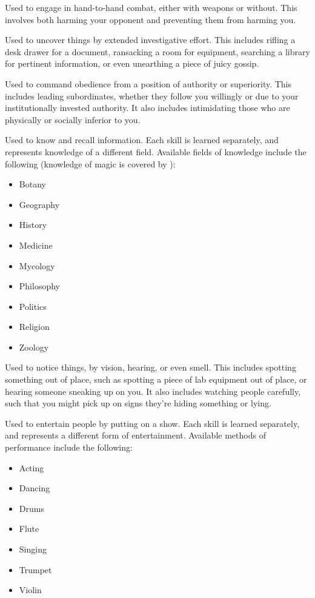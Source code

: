 
Used to engage in hand-to-hand combat, either with weapons or without.
This involves both harming your opponent and preventing them from harming you.


Used to uncover things by extended investigative effort.
This includes rifling a desk drawer for a document, ransacking a room for equipment, searching a library for pertinent information, or even unearthing a piece of juicy gossip.


Used to command obedience from a position of authority or superiority.
This includes leading subordinates, whether they follow you willingly or due to your institutionally invested authority.
It also includes intimidating those who are physically or socially inferior to you.


Used to know and recall information.
Each  skill is learned separately, and represents knowledge of a different field.
Available fields of knowledge include the following (knowledge of magic is covered by {\magicskills}):
\begin{itemize}
	\item Botany
	\item Geography
	\item History
	\item Medicine
	\item Mycology %
	\item Philosophy
	\item Politics
	\item Religion
	\item Zoology
\end{itemize}


Used to notice things, by vision, hearing, or even smell.
This includes spotting something out of place, such as spotting a piece of lab equipment out of place, or hearing someone sneaking up on you.
It also includes watching people carefully, such that you might pick up on signs they're hiding something or lying.


Used to entertain people by putting on a show.
Each  skill is learned separately, and represents a different form of entertainment.
Available methods of performance include the following:
\begin{itemize}
	\item Acting
	\item Dancing
	\item Drums
	\item Flute
	\item Singing
	\item Trumpet
	\item Violin
\end{itemize}

